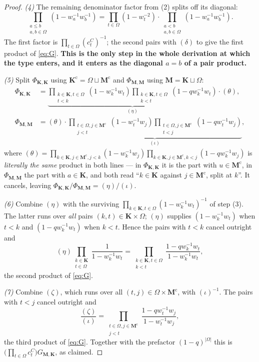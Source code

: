 \documentclass[11pt]{article}
\theoremstyle{plain}
\theoremstyle{definition}
\theoremstyle{remark}
\newcommand{\bM}{\mathbf M}
\newcommand{\bK}{\mathbf K}
\newcommand{\cm}{{\mathrm c}}
\newcommand{\Om}{\Omega}
\begin{document}
\begin{proof}
\emph{(4)} The remaining denominator factor from (2) splits off its diagonal:
\[
\prod_{\substack{a\le b\\a,b\in\Om}}(1-w_a^{-1}w_b^{-1})
=\prod_{t\in\Om}(1-w_t^{-2})\cdot\prod_{\substack{a<b\\a,b\in\Om}}(1-w_a^{-1}w_b^{-1}).
\]
The first factor is $\prod_{t\in\Om}(c^C_t)^{-1}$; the second pairs with $(\delta)$
to give the first product of \eqref{eq:G}. \textbf{This is the only step in the
whole derivation at which the type enters, and it enters as the diagonal $a=b$ of a
pair product.}

\emph{(5)} Split $\Phi_{\bK,\bK}$ using $\bK^\cm=\Om\sqcup\bM^\cm$ and
$\Phi_{\bM,\bM}$ using $\bM=\bK\sqcup\Om$:
\begin{align*}
\Phi_{\bK,\bK}&=
\underbrace{\prod_{\substack{k\in\bK,t\in\Om\\t<k}}\!\!(1-w_k^{-1}w_t)
\prod_{\substack{k\in\bK,t\in\Om\\k<t}}\!\!(1-qw_k^{-1}w_t)}_{(\eta)}
\cdot(\theta),\\
\Phi_{\bM,\bM}&=(\theta)\cdot
\underbrace{\prod_{\substack{t\in\Om,j\in\bM^\cm\\j<t}}\!\!(1-w_t^{-1}w_j)
\prod_{\substack{t\in\Om,j\in\bM^\cm\\t<j}}\!\!(1-qw_t^{-1}w_j)}_{(\iota)},
\end{align*}
where
$(\theta)=\prod_{k\in\bK,j\in\bM^\cm,j<k}(1-w_k^{-1}w_j)
\prod_{k\in\bK,j\in\bM^\cm,k<j}(1-qw_k^{-1}w_j)$
is \emph{literally the same} product in both lines --- in $\Phi_{\bK,\bK}$ it is
the part with $u\in\bM^\cm$, in $\Phi_{\bM,\bM}$ the part with $a\in\bK$, and both
read ``$k\in\bK$ against $j\in\bM^\cm$, split at $k$''. It cancels, leaving
$\Phi_{\bK,\bK}/\Phi_{\bM,\bM}=(\eta)/(\iota)$.

\emph{(6)} Combine $(\eta)$ with the surviving
$\prod_{k\in\bK,t\in\Om}(1-w_k^{-1}w_t)^{-1}$ of step (3). The latter runs over
\emph{all} pairs $(k,t)\in\bK\times\Om$; $(\eta)$ supplies $(1-w_k^{-1}w_t)$ when
$t<k$ and $(1-qw_k^{-1}w_t)$ when $k<t$. Hence the pairs with $t<k$ cancel outright
and
\[
(\eta)\prod_{\substack{k\in\bK\\t\in\Om}}\frac1{1-w_k^{-1}w_t}
=\prod_{\substack{k\in\bK,t\in\Om\\k<t}}\frac{1-qw_k^{-1}w_t}{1-w_k^{-1}w_t},
\]
the second product of \eqref{eq:G}.

\emph{(7)} Combine $(\zeta)$, which runs over all $(t,j)\in\Om\times\bM^\cm$, with
$(\iota)^{-1}$. The pairs with $t<j$ cancel outright and
\[
\frac{(\zeta)}{(\iota)}
=\prod_{\substack{t\in\Om,j\in\bM^\cm\\j<t}}\frac{1-qw_t^{-1}w_j}{1-w_t^{-1}w_j},
\]
the third product of \eqref{eq:G}. Together with the prefactor $(1-q)^{|\Om|}$ this
is $\bigl(\prod_{t\in\Om}c^C_t\bigr)G_{\bM,\bK}$, as claimed.


\end{proof}
\end{document}
